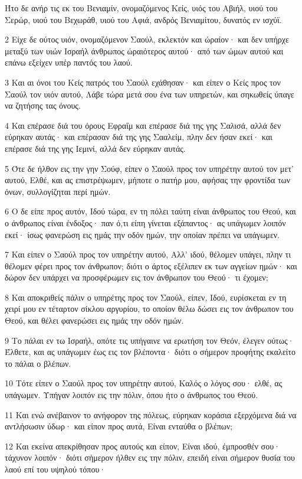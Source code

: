 \par Ήτο δε ανήρ τις εκ του Βενιαμίν, ονομαζόμενος Κείς, υιός του Αβιήλ, υιού του Σερώρ, υιού του Βεχωράθ, υιού του Αφιά, ανδρός Βενιαμίτου, δυνατός εν ισχύϊ.
\par 2 Είχε δε ούτος υιόν, ονομαζόμενον Σαούλ, εκλεκτόν και ώραίον· και δεν υπήρχε μεταξύ των υιών Ισραήλ άνθρωπος ώραιότερος αυτού· από των ώμων αυτού και επάνω εξείχεν υπέρ παντός του λαού.
\par 3 Και αι όνοι του Κείς πατρός του Σαούλ εχάθησαν· και είπεν ο Κείς προς τον Σαούλ τον υιόν αυτού, Λάβε τώρα μετά σου ένα των υπηρετών, και σηκωθείς ύπαγε να ζητήσης τας όνους.
\par 4 Και επέρασε διά του όρους Εφραΐμ και επέρασε διά της γης Σαλισά, αλλά δεν εύρηκαν αυτάς· και επέρασαν διά της γης Σααλείμ, πλην δεν ήσαν εκεί· και επέρασε διά της γης Ιεμινί, αλλά δεν εύρηκαν αυτάς.
\par 5 Ότε δε ήλθον εις την γην Σούφ, είπεν ο Σαούλ προς τον υπηρέτην αυτού τον μετ' αυτού, Ελθέ, και ας επιστρέψωμεν, μήποτε ο πατήρ μου, αφήσας την φροντίδα των όνων, συλλογίζηται περί ημών.
\par 6 Ο δε είπε προς αυτόν, Ιδού τώρα, εν τη πόλει ταύτη είναι άνθρωπος του Θεού, και ο άνθρωπος είναι ένδοξος· παν ό,τι είπη γίνεται εξάπαντος· ας υπάγωμεν λοιπόν εκεί· ίσως φανερώση εις ημάς την οδόν ημών, την οποίαν πρέπει να υπάγωμεν.
\par 7 Και είπεν ο Σαούλ προς τον υπηρέτην αυτού, Αλλ' ιδού, θέλομεν υπάγει, πλην τι θέλομεν φέρει προς τον άνθρωπον; διότι ο άρτος εξέλιπεν εκ των αγγείων ημών· και δώρον δεν υπάρχει να προσφέρωμεν εις τον άνθρωπον του Θεού· τι έχομεν;
\par 8 Και αποκριθείς πάλιν ο υπηρέτης προς τον Σαούλ, είπεν, Ιδού, ευρίσκεται εν τη χειρί μου εν τέταρτον σίκλου αργυρίου, το οποίον θέλω δώσει εις τον άνθρωπον του Θεού, και θέλει φανερώσει εις ημάς την οδόν ημών.
\par 9 Το πάλαι εν τω Ισραήλ, οπότε τις υπήγαινε να ερωτήση τον Θεόν, έλεγεν ούτως· Έλθετε, και ας υπάγωμεν έως εις τον βλέποντα· διότι ο σήμερον προφήτης εκαλείτο το πάλαι ο βλέπων.
\par 10 Τότε είπεν ο Σαούλ προς τον υπηρέτην αυτού, Καλός ο λόγος σου· ελθέ, ας υπάγωμεν. Υπήγαν λοιπόν εις την πόλιν, όπου ήτο ο άνθρωπος του Θεού.
\par 11 Και ενώ ανέβαινον το ανήφορον της πόλεως, εύρηκαν κοράσια εξερχόμενα διά να αντλήσωσιν ύδωρ· και είπον προς αυτά, Είναι ενταύθα ο βλέπων;
\par 12 Και εκείνα απεκρίθησαν προς αυτούς και είπον, Είναι ιδού, έμπροσθέν σου· τάχυνον λοιπόν· διότι σήμερον ήλθεν εις την πόλιν, επειδή είναι σήμερον θυσία του λαού επί του υψηλού τόπου·
